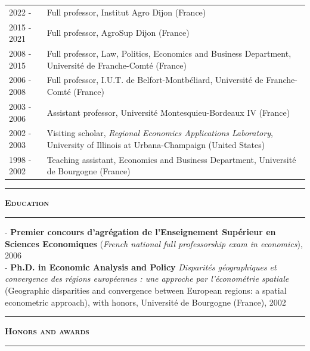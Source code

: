 \documentclass[a4paper,12pt]{article}
\newcommand{\titre}[1]{%
	\bigskip
	\noindent \rule[2mm]{\textwidth}{0.5pt}
	\textbf{\textsc{\large #1}} \\
	\noindent \rule[1mm]{\textwidth}{0.5pt}
	}
\begin{document}
\noindent \begin{longtable}{@{}p{\annee}p{\texte}@{}}
2022 -	& Full professor, Institut Agro Dijon (France) \\
2015 - 2021 & Full professor, AgroSup Dijon (France) \\
2008 - 2015 & Full professor, Law, Politics, Economics and Business Department, Université de Franche-Comté (France) \\
2006 - 2008 & Full professor, I.U.T. de Belfort-Montbéliard, Université de Franche-Comté (France) \\
2003 - 2006 & Assistant professor, Université Montesquieu-Bordeaux IV (France) \\
2002 - 2003 & Visiting scholar, \textit{Regional Economics Applications Laboratory}, University of Illinois at Urbana-Champaign (United States) \\
1998 - 2002 & Teaching assistant, Economics and Business Department, Université de Bourgogne (France) \\
\end{longtable}

\newpage


\titre{Education}

\noindent - \textbf{Premier concours d'agrégation de l'Enseignement Supérieur en Sciences Economiques} (\textit{French national full professorship exam in economics}), 2006 \\
- \textbf{Ph.D. in Economic Analysis and Policy} \newline {} \og{}\textit{Disparités géographiques et convergence des régions européennes : une approche par l'économétrie spatiale}\fg{} (\og{}Geographic disparities and convergence between European regions: a spatial econometric approach\fg{}), with honors, Université de Bourgogne (France), 2002 \\


\titre{Honors and awards}
\end{document}
